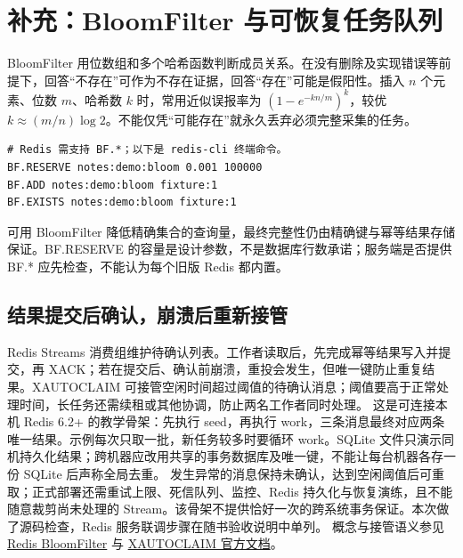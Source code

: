 \section{补充：BloomFilter 与可恢复任务队列}\label{rev:crawler:redis}
BloomFilter 用位数组和多个哈希函数判断成员关系。在没有删除及实现错误等前提下，回答“不存在”可作为不存在证据，回答“存在”可能是假阳性。插入 $n$ 个元素、位数 $m$、哈希数 $k$ 时，常用近似误报率为 $(1-e^{-kn/m})^k$，较优 $k\approx(m/n)\log2$。不能仅凭“可能存在”就永久丢弃必须完整采集的任务。
\begin{Verbatim}
# Redis 需支持 BF.*；以下是 redis-cli 终端命令。
BF.RESERVE notes:demo:bloom 0.001 100000
BF.ADD notes:demo:bloom fixture:1
BF.EXISTS notes:demo:bloom fixture:1
\end{Verbatim}
可用 BloomFilter 降低精确集合的查询量，最终完整性仍由精确键与幂等结果存储保证。BF.RESERVE 的容量是设计参数，不是数据库行数承诺；服务端是否提供 BF.* 应先检查，不能认为每个旧版 Redis 都内置。

\subsection{结果提交后确认，崩溃后重新接管}
Redis Streams 消费组维护待确认列表。工作者读取后，先完成幂等结果写入并提交，再 XACK；若在提交后、确认前崩溃，重投会发生，但唯一键防止重复结果。XAUTOCLAIM 可接管空闲时间超过阈值的待确认消息；阈值要高于正常处理时间，长任务还需续租或其他协调，防止两名工作者同时处理。
这是可连接本机 Redis 6.2+ 的教学骨架：先执行 seed，再执行 work，三条消息最终对应两条唯一结果。示例每次只取一批，新任务较多时要循环 work。SQLite 文件只演示同机持久化结果；跨机器应改用共享的事务数据库及唯一键，不能让每台机器各存一份 SQLite 后声称全局去重。
发生异常的消息保持未确认，达到空闲阈值后可重取；正式部署还需重试上限、死信队列、监控、Redis 持久化与恢复演练，且不能随意裁剪尚未处理的 Stream。该骨架不提供恰好一次的跨系统事务保证。本次做了源码检查，Redis 服务联调步骤在随书验收说明中单列。
概念与接管语义参见 \href{https://redis.io/docs/latest/develop/data-types/probabilistic/bloom-filter/}{Redis BloomFilter} 与 \href{https://redis.io/docs/latest/commands/xautoclaim/}{XAUTOCLAIM 官方文档}。
